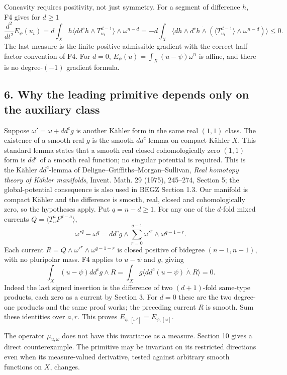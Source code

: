 \documentclass[
  10pt,
]{article}
\begin{document}
Concavity requires positivity, not just symmetry. For a segment of
difference \(h\), F4 gives for \(d\geq1\) \[
\frac{d^2}{dt^2}E_\psi(u_t)
=d\int_Xh\langle dd^ch\wedge T_{u_t}^{d-1}\rangle\wedge\omega^{n-d}
=-d\int_X\langle dh\wedge d^ch\mathbin{\dot\wedge}
(\langle T_{u_t}^{d-1}\rangle\wedge\omega^{n-d})\rangle\leq0.
\] The last measure is the finite positive admissible gradient with the
correct half-factor convention of F4. For \(d=0\),
\(E_\psi(u)=\int_X(u-\psi)\omega^n\) is affine, and there is no
degree-\((-1)\) gradient formula.

\subsection{6. Why the leading primitive depends only on the auxiliary
class}\label{why-the-leading-primitive-depends-only-on-the-auxiliary-class}

Suppose \(\omega'=\omega+dd^cg\) is another Kähler form in the same real
\((1,1)\) class. The existence of a smooth real \(g\) is the smooth
\(dd^c\)-lemma on compact Kähler \(X\). This standard lemma states that
a smooth real closed cohomologically zero \((1,1)\) form is \(dd^c\) of
a smooth real function; no singular potential is required. This is the
Kähler \(dd^c\)-lemma of Deligne--Griffiths--Morgan--Sullivan,
\emph{Real homotopy theory of Kähler manifolds}, Invent. Math. 29
(1975), 245--274, Section 5; the global-potential consequence is also
used in BEGZ Section 1.3. Our manifold is compact Kähler and the
difference is smooth, real, closed and cohomologically zero, so the
hypotheses apply. Put \(q=n-d\geq1\). For any one of the \(d\)-fold
mixed currents \(Q=\langle T_u^aP^{d-a}\rangle\), \[
\omega'^q-\omega^q=dd^cg\wedge\sum_{r=0}^{q-1}\omega'^r\wedge\omega^{q-1-r}.
\] Each current \(R=Q\wedge\omega'^r\wedge\omega^{q-1-r}\) is closed
positive of bidegree \((n-1,n-1)\), with no pluripolar mass. F4 applies
to \(u-\psi\) and \(g\), giving \[
\int_X(u-\psi)dd^cg\wedge R
=\int_Xg\langle dd^c(u-\psi)\mathbin{\dot\wedge}R\rangle=0.
\] Indeed the last signed insertion is the difference of two
\((d+1)\)-fold same-type products, each zero as a current by Section 3.
For \(d=0\) these are the two degree-one products and the same proof
works; the preceding current \(R\) is smooth. Sum these identities over
\(a,r\). This proves \(E_{\psi,[\omega']}=E_{\psi,[\omega]}\).

The operator \(\mu_{u,\omega}\) does not have this invariance as a
measure. Section 10 gives a direct counterexample. The primitive may be
invariant on its restricted directions even when its measure-valued
derivative, tested against arbitrary smooth functions on \(X\), changes.
\end{document}
